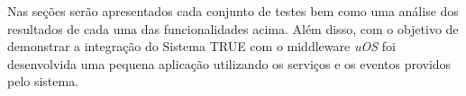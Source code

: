 	Nas seções serão apresentados cada conjunto de testes bem como uma análise dos resultados de cada uma das funcionalidades acima. Além disso, com o objetivo de
	demonstrar a integração do Sistema TRUE com o middleware \textit{uOS} foi desenvolvida uma pequena
	aplicação utilizando os serviços e os eventos providos pelo sistema. 

	

	

	

	